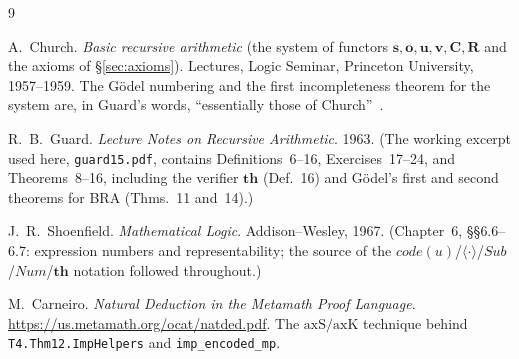 \documentclass[11pt]{article}
\theoremstyle{plain}
\theoremstyle{definition}
\theoremstyle{remark}
\newcommand{\code}[1]{\mathit{code}(#1)}
\newcommand{\seq}[1]{\langle #1 \rangle}
\newcommand{\Sub}{\mathit{Sub}}
\newcommand{\Num}{\mathit{Num}}
\begin{document}
\begin{thebibliography}{9}

A.~Church.
\emph{Basic recursive arithmetic} (the system of functors
$\mathbf{s},\mathbf{o},\mathbf{u},\mathbf{v},\mathbf{C},\mathbf{R}$ and
the axioms of {\S}\ref{sec:axioms}).
Lectures, Logic Seminar, Princeton University, 1957--1959.
The G\"odel numbering and the first incompleteness theorem for the
system are, in Guard's words, ``essentially those of
Church''~\cite[p.~13]{Guard1963}.

R.~B.~Guard.
\emph{Lecture Notes on Recursive Arithmetic}.
1963.
(The working excerpt used here, \texttt{guard15.pdf}, contains
Definitions~6--16, Exercises~17--24, and Theorems~8--16, including the
verifier $\mathbf{th}$ (Def.~16) and G\"odel's first and second theorems
for BRA (Thms.~11 and~14).)

J.~R.~Shoenfield.
\emph{Mathematical Logic}.
Addison--Wesley, 1967.
(Chapter~6, {\S}{\S}6.6--6.7: expression numbers and representability;
the source of the $\code{u}$/$\seq{\cdot}$/$\Sub$/$\Num$/$\mathbf{th}$
notation followed throughout.)

M.~Carneiro.
\emph{Natural Deduction in the Metamath Proof Language}.
\url{https://us.metamath.org/ocat/natded.pdf}.
The $\mathrm{axS}/\mathrm{axK}$ technique behind
\texttt{T4.Thm12.ImpHelpers} and \texttt{imp\_encoded\_mp}.

\end{thebibliography}
\end{document}
